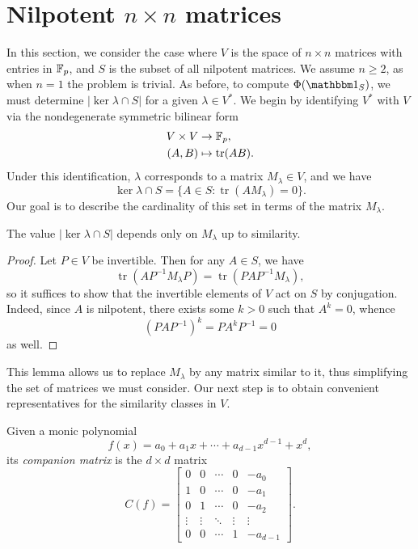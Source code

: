 \newcommand{\Mat}{\operatorname{Mat}}
\newcommand{\tr}{\operatorname{tr}}
\newcommand{\fact}{\operatorname{fact}}

\section{Nilpotent $n\times n$ matrices}\label{sec:part3}

In this section, we consider the case where $V$ is the space of $n\times n$ matrices with entries in $\mathbb{F}_p$, and $S$ is the subset of all nilpotent matrices. We assume $n\ge 2$, as when $n=1$ the problem is trivial. As before, to compute $\Phi(\IND_S)$, we must determine $|\ker\lambda\cap S|$ for a given $\lambda\in V^*$. We begin by identifying $V^*$ with $V$ via the nondegenerate symmetric bilinear form
\begin{align*}
V\times V&\to\F_p,\\
(A,B)&\mapsto\tr(AB).
\end{align*}
Under this identification, $\lambda$ corresponds to a matrix $M_\lambda\in V$, and we have
\begin{equation}
\label{eqn:kerlambda}
\ker\lambda\cap S=\{A\in S:\tr(AM_\lambda)=0\}.
\end{equation}
Our goal is to describe the cardinality of this set in terms of the matrix $M_\lambda$.
\begin{lem}
\label{lem:sim}
The value $|\ker\lambda\cap S|$ depends only on $M_\lambda$ up to similarity.
\end{lem}
\begin{proof}
Let $P\in V$ be invertible. Then for any $A\in S$, we have
\begin{equation*}
\tr(AP^{-1}M_\lambda P)=\tr(PAP^{-1}M_\lambda),
\end{equation*}
so it suffices to show that the invertible elements of $V$ act on $S$ by conjugation. Indeed, since $A$ is nilpotent, there exists some $k>0$ such that $A^k=0$, whence
\begin{equation*}
(PAP^{-1})^k=PA^kP^{-1}=0
\end{equation*}
as well.
\end{proof}
This lemma allows us to replace $M_\lambda$ by any matrix similar to it, thus simplifying the set of matrices we must consider. Our next step is to obtain convenient representatives for the similarity classes in $V$.
\begin{notation}
Given a monic polynomial
\begin{equation*}
f(x)=a_0+a_1x+\cdots+a_{d-1}x^{d-1}+x^d,
\end{equation*}
its \emph{companion matrix} is the $d\times d$ matrix
\begin{equation*}
C(f)=\begin{bmatrix}
0&0&\cdots&0&-a_0\\
1&0&\cdots&0&-a_1\\
0&1&\cdots&0&-a_2\\
\vdots&\vdots&\ddots&\vdots&\vdots\\
0&0&\cdots&1&-a_{d-1}
\end{bmatrix}.
\end{equation*}
\end{notation}
